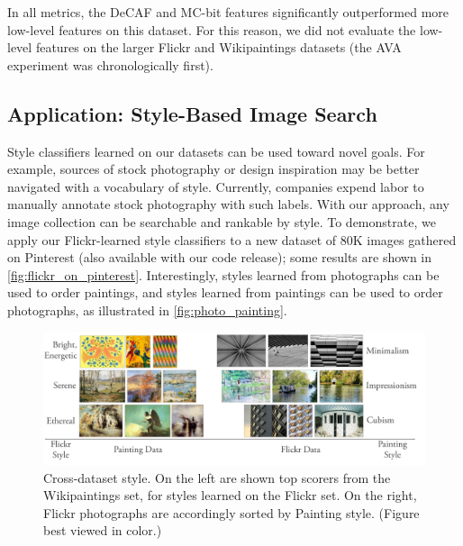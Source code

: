 In all metrics, the DeCAF and MC-bit features significantly outperformed more low-level features on this dataset.
For this reason, we did not evaluate the low-level features on the larger Flickr and Wikipaintings datasets (the AVA experiment was chronologically first).

\subsection{Application: Style-Based Image Search}

Style classifiers learned on our datasets can be used toward novel goals.
For example, sources of stock photography or design inspiration may be better navigated with a vocabulary of style.
Currently, companies expend labor to manually annotate stock photography with such labels.
With our approach, any image collection can be searchable and rankable by style.
To demonstrate, we apply our Flickr-learned style classifiers to a new dataset of 80K images gathered on Pinterest (also available with our code release); some results are shown in \autoref{fig:flickr_on_pinterest}.
Interestingly, styles learned from photographs can be used to order paintings, and styles learned from paintings can be used to order photographs, as illustrated in \autoref{fig:photo_painting}.

\begin{figure}[ht]
\centering
\includegraphics[width=\linewidth]{../style/figures/style_by_style.pdf}
\caption[Cross-dataset understanding of style demonstrated by applying Wikipaintings-learned classifiers to phoitographs, and Flickr-learned classifiers to paintings.]{
    Cross-dataset style.
    On the left are shown top scorers from the Wikipaintings set, for styles learned on the Flickr set.
    On the right, Flickr photographs are accordingly sorted by Painting style.
    (Figure best viewed in color.)
}
\label{fig:photo_painting}
\end{figure}

